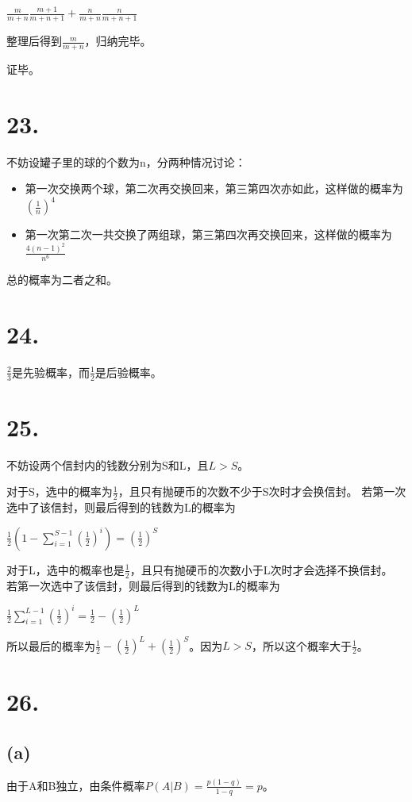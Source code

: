 \documentclass[UTF8]{article}
\begin{document}
        $\frac{m}{m + n}\frac{m + 1}{m + n + 1} + \frac{n}{m + n}\frac{n}{m + n + 1}$

        整理后得到$\frac{m}{m + n}$，归纳完毕。

        证毕。
    \section*{23.}
        不妨设罐子里的球的个数为n，分两种情况讨论：
        \begin{itemize}
            \item 第一次交换两个球，第二次再交换回来，第三第四次亦如此，这样做的概率为$(\frac{1}{n})^4$
            \item 第一次第二次一共交换了两组球，第三第四次再交换回来，这样做的概率为$\frac{4(n - 1)^2}{n^6}$
        \end{itemize}
        总的概率为二者之和。
    \section*{24.}
        $\frac{2}{3}$是先验概率，而$\frac{1}{2}$是后验概率。
    \section*{25.}
        不妨设两个信封内的钱数分别为S和L，且$L > S$。

        对于S，选中的概率为$\frac{1}{2}$，且只有抛硬币的次数不少于S次时才会换信封。
        若第一次选中了该信封，则最后得到的钱数为L的概率为

        $\frac{1}{2}(1 - \sum_{i = 1}^{S - 1}(\frac{1}{2})^i) = (\frac{1}{2})^S$

        对于L，选中的概率也是$\frac{1}{2}$，且只有抛硬币的次数小于L次时才会选择不换信封。
        若第一次选中了该信封，则最后得到的钱数为L的概率为

        $\frac{1}{2}\sum_{i = 1}^{L - 1}(\frac{1}{2})^i = \frac{1}{2} - (\frac{1}{2})^L$

        所以最后的概率为$\frac{1}{2} - (\frac{1}{2})^L + (\frac{1}{2})^S$。因为$L > S$，所以这个概率大于$\frac{1}{2}$。
    \section*{26.}
        \subsection*{(a)}
            由于A和B独立，由条件概率$P(A|B) = \frac{p(1 - q)}{1 -q} = p$。
\end{document}
